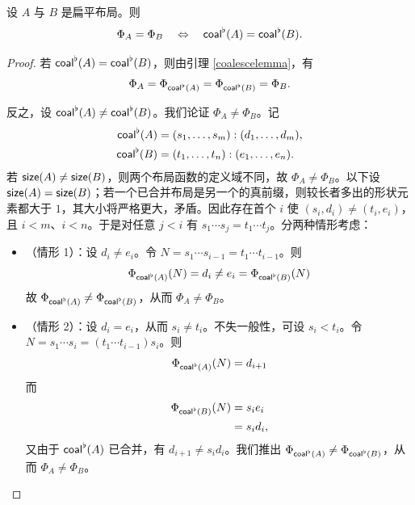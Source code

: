 \begin{proposition} \label{coalesceproposition}
    设 $A$ 与 $B$ 是扁平布局。则
    \[
    \Phi_A = \Phi_B \quad \Leftrightarrow \quad \mathsf{coal}^\flat(A) = \mathsf{coal}^\flat(B).
    \]
\end{proposition}
\begin{proof}
    若 $\mathsf{coal}^\flat(A) = \mathsf{coal}^\flat(B)$，则由引理 \ref{coalescelemma}，有
    \[ \Phi_A = \Phi_{\mathsf{coal}^\flat(A)} = \Phi_{\mathsf{coal}^\flat(B)} = \Phi_B.\]

    \noindent 反之，设 $\mathsf{coal}^\flat(A) \neq \mathsf{coal}^\flat(B)$。我们论证 $\Phi_A \neq \Phi_B$。记
    \begin{align*}
    \mathsf{coal}^\flat(A) & = (s_1,\dots,s_m) : (d_1,\dots,d_m)\text{,} \\
    \mathsf{coal}^\flat(B) & = (t_1,\dots,t_n) : (e_1,\dots,e_n).
    \end{align*}
    若 $\mathsf{size}(A)\neq \mathsf{size}(B)$，则两个布局函数的定义域不同，故 $\Phi_A\neq\Phi_B$。以下设 $\mathsf{size}(A)=\mathsf{size}(B)$；若一个已合并布局是另一个的真前缀，则较长者多出的形状元素都大于 $1$，其大小将严格更大，矛盾。因此存在首个 $i$ 使 $(s_i,d_i)\neq(t_i,e_i)$，且 $i<m$、$i<n$。于是对任意 $j < i$ 有 $s_1 \cdots s_j = t_1 \cdots t_j$。分两种情形考虑：\\

    \begin{itemize}
    \item （情形 1）：设 $d_i \neq e_i$。令 $N = s_1 \cdots s_{i-1} = t_1 \cdots t_{i-1}$。则
        \[
        \Phi_{\mathsf{coal}^\flat(A)}(N) = d_i \neq e_i = \Phi_{\mathsf{coal}^\flat(B)}(N)
        \]
        故 $\Phi_{\mathsf{coal}^\flat(A)} \neq \Phi_{\mathsf{coal}^\flat(B)}$，从而 $\Phi_A \neq \Phi_B$。\\

     \item （情形 2）：设 $d_i = e_i$，从而 $s_i \neq t_i$。不失一般性，可设 $s_i < t_i$。令 $N = s_1 \cdots s_i = (t_1 \cdots t_{i-1}) s_i$。则
        \[
        \Phi_{\mathsf{coal}^\flat(A)}(N)= d_{i+1}
        \]
        而
        \begin{align*}
        \Phi_{\mathsf{coal}^\flat(B)}(N) & = s_ie_i\\
        & = s_id_i,
        \end{align*}
        又由于 $\mathsf{coal}^\flat(A)$ 已合并，有 $d_{i+1} \neq s_id_i$。我们推出 $\Phi_{\mathsf{coal}^\flat(A)} \neq \Phi_{\mathsf{coal}^\flat(B)}$，从而 $\Phi_A \neq \Phi_B$。
    \end{itemize}
\end{proof}

